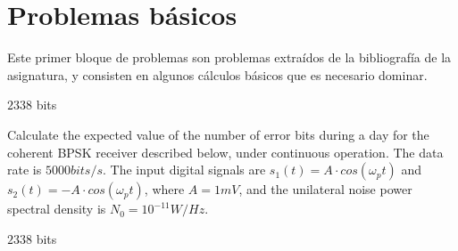 \documentclass[es,boletin]{uah}
\begin{document}

\maketitle

\section{Problemas básicos}
Este primer bloque de problemas son problemas extraídos de la bibliografía de la asignatura, y consisten en algunos cálculos básicos que es necesario dominar.




{
$2338$ bits
}		
{

	\cite{Sklar} Calculate the expected value of the number of error bits during a day for the coherent BPSK receiver described below, under continuous operation. The data rate is $5000 bits/s$. The input digital signals are $s_1(t) = A\cdot cos(\omega_p t)$ and $s_2(t)=-A \cdot cos(\omega_p t)$, where $A = 1 mV$, and the unilateral noise power spectral density is $N_0 = 10^{-11} W/Hz$. 

}
{

$2338$ bits
}		
\end{document}
